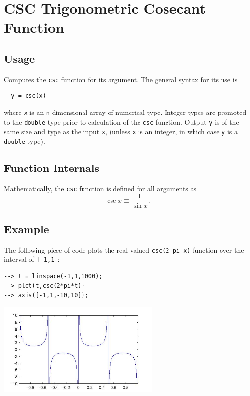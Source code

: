 \section{CSC Trigonometric Cosecant Function}

\subsection{Usage}

Computes the \verb|csc| function for its argument.  The general
syntax for its use is
\begin{verbatim}
  y = csc(x)
\end{verbatim}
where \verb|x| is an \verb|n|-dimensional array of numerical type.
Integer types are promoted to the \verb|double| type prior to
calculation of the \verb|csc| function.  Output \verb|y| is of the
same size and type as the input \verb|x|, (unless \verb|x| is an
integer, in which case \verb|y| is a \verb|double| type).  
\subsection{Function Internals}

Mathematically, the \verb|csc| function is defined for all arguments
as
\[
   \csc x \equiv \frac{1}{\sin x}.
\]
\subsection{Example}

The following piece of code plots the real-valued \verb|csc(2 pi x)|
function over the interval of \verb|[-1,1]|:
\begin{verbatim}
--> t = linspace(-1,1,1000);
--> plot(t,csc(2*pi*t))
--> axis([-1,1,-10,10]);
\end{verbatim}


\centerline{\includegraphics[width=8cm]{cscplot}}


